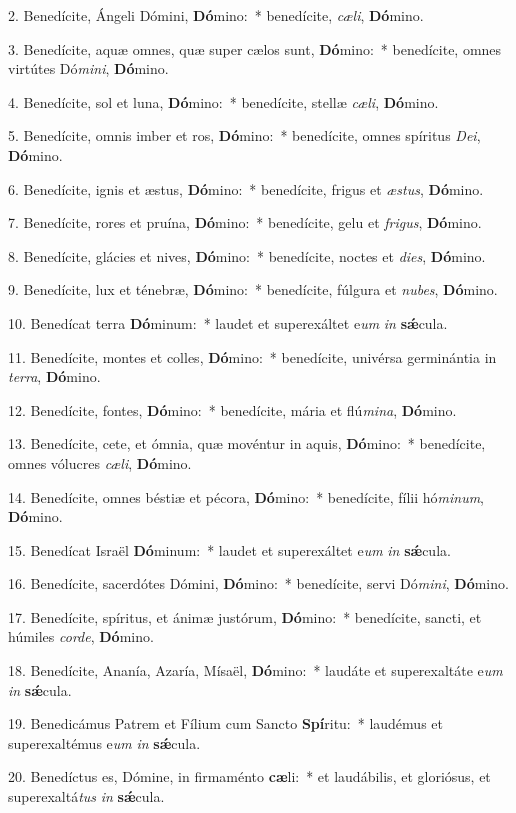 
2. Benedícite, Ángeli Dómini, \textbf{Dó}mino:~* benedícite, \textit{cæ}\textit{li}, \textbf{Dó}mino.

3. Benedícite, aquæ omnes, quæ super cælos sunt, \textbf{Dó}mino:~* benedícite, omnes virtútes Dó\textit{mi}\textit{ni}, \textbf{Dó}mino.

4. Benedícite, sol et luna, \textbf{Dó}mino:~* benedícite, stellæ \textit{cæ}\textit{li}, \textbf{Dó}mino.

5. Benedícite, omnis imber et ros, \textbf{Dó}mino:~* benedícite, omnes spíritus \textit{De}\textit{i}, \textbf{Dó}mino.

6. Benedícite, ignis et æstus, \textbf{Dó}mino:~* benedícite, frigus et \textit{æs}\textit{tus}, \textbf{Dó}mino.

7. Benedícite, rores et pruína, \textbf{Dó}mino:~* benedícite, gelu et \textit{fri}\textit{gus}, \textbf{Dó}mino.

8. Benedícite, glácies et nives, \textbf{Dó}mino:~* benedícite, noctes et \textit{di}\textit{es}, \textbf{Dó}mino.

9. Benedícite, lux et ténebræ, \textbf{Dó}mino:~* benedícite, fúlgura et \textit{nu}\textit{bes}, \textbf{Dó}mino.

10. Benedícat terra \textbf{Dó}minum:~* laudet et superexáltet e\textit{um} \textit{in} \textbf{s\'{\ae}}cula.

11. Benedícite, montes et colles, \textbf{Dó}mino:~* benedícite, univérsa germinántia in \textit{ter}\textit{ra}, \textbf{Dó}mino.

12. Benedícite, fontes, \textbf{Dó}mino:~* benedícite, mária et flú\textit{mi}\textit{na}, \textbf{Dó}mino.

13. Benedícite, cete, et ómnia, quæ movéntur in aquis, \textbf{Dó}mino:~* benedícite, omnes vólucres \textit{cæ}\textit{li}, \textbf{Dó}mino.

14. Benedícite, omnes béstiæ et pécora, \textbf{Dó}mino:~* benedícite, fílii hó\textit{mi}\textit{num}, \textbf{Dó}mino.

15. Benedícat Israël \textbf{Dó}minum:~* laudet et superexáltet e\textit{um} \textit{in} \textbf{s\'{\ae}}cula.

16. Benedícite, sacerdótes Dómini, \textbf{Dó}mino:~* benedícite, servi Dó\textit{mi}\textit{ni}, \textbf{Dó}mino.

17. Benedícite, spíritus, et ánimæ justórum, \textbf{Dó}mino:~* benedícite, sancti, et húmiles \textit{cor}\textit{de}, \textbf{Dó}mino.

18. Benedícite, Ananía, Azaría, Mísaël, \textbf{Dó}mino:~* laudáte et superexaltáte e\textit{um} \textit{in} \textbf{s\'{\ae}}cula.

19. Benedicámus Patrem et Fílium cum Sancto \textbf{Spí}ritu:~* laudémus et superexaltémus e\textit{um} \textit{in} \textbf{s\'{\ae}}cula.

20. Benedíctus es, Dómine, in firmaménto \textbf{cæ}li:~* et laudábilis, et gloriósus, et superexaltá\textit{tus} \textit{in} \textbf{s\'{\ae}}cula.